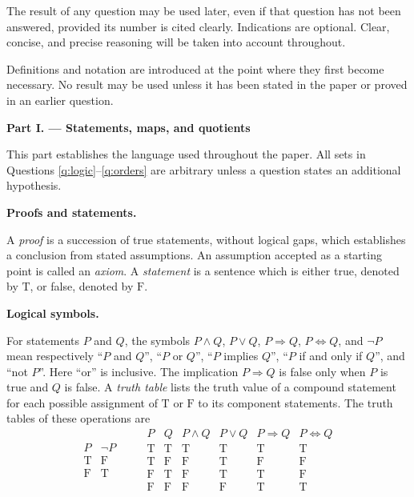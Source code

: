 \documentclass[10pt,a4paper]{article}
\newcommand{\concept}[1]{%
  \par\addvspace{0.55\baselineskip}\noindent\textbf{#1.}\enspace
}
\newcommand{\exampart}[2]{%
  \clearpage
  \markboth{Part #1}{}
  \begin{center}
    {\large\bfseries Part #1. --- #2}
  \end{center}
}
\begin{document}
The result of any question may be used later, even if that question has not
been answered, provided its number is cited clearly.  Indications are
optional.  Clear, concise, and precise reasoning will be taken into account
throughout.

Definitions and notation are introduced at the point where they first become
necessary.  No result may be used unless it has been stated in the paper or
proved in an earlier question.

\exampart{I}{Statements, maps, and quotients}

This part establishes the language used throughout the paper.  All sets in
Questions \ref{q:logic}--\ref{q:orders} are arbitrary unless a question
states an additional hypothesis.

\concept{Proofs and statements}
A \emph{proof} is a succession of true statements, without logical gaps, which
establishes a conclusion from stated assumptions.  An assumption accepted as
a starting point is called an \emph{axiom}.  A \emph{statement} is a sentence
which is either true, denoted by $\mathrm T$, or false, denoted by
$\mathrm F$.

\concept{Logical symbols}
For statements $P$ and $Q$, the symbols $P\wedge Q$, $P\vee Q$,
$P\Rightarrow Q$, $P\Longleftrightarrow Q$, and $\neg P$ mean respectively
``$P$ and $Q$'', ``$P$ or $Q$'', ``$P$ implies $Q$'', ``$P$ if and only if
$Q$'', and ``not $P$''.  Here ``or'' is inclusive.  The implication
$P\Rightarrow Q$ is false only when $P$ is true and $Q$ is false.
A \emph{truth table} lists the truth value of a compound statement for each
possible assignment of $\mathrm T$ or $\mathrm F$ to its component
statements.  The truth tables of these operations are
\[
  \begin{array}{c|c}
    P & \neg P\\ \hline
    \mathrm T & \mathrm F\\
    \mathrm F & \mathrm T
  \end{array}
  \qquad
  \begin{array}{cc|c|c|c|c}
    P & Q & P\wedge Q & P\vee Q & P\Rightarrow Q
      & P\Longleftrightarrow Q\\ \hline
    \mathrm T & \mathrm T & \mathrm T & \mathrm T & \mathrm T & \mathrm T\\
    \mathrm T & \mathrm F & \mathrm F & \mathrm T & \mathrm F & \mathrm F\\
    \mathrm F & \mathrm T & \mathrm F & \mathrm T & \mathrm T & \mathrm F\\
    \mathrm F & \mathrm F & \mathrm F & \mathrm F & \mathrm T & \mathrm T
  \end{array}
\]
\end{document}
